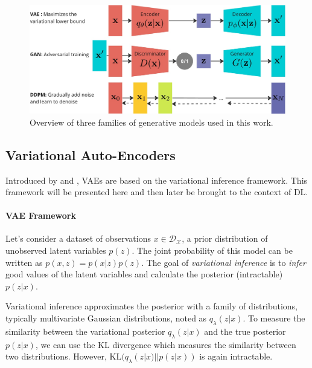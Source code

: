 \begin{figure}[tb]
      \begin{center}
          \includegraphics[width=1.0\linewidth]{images/related/generative_models_overview.jpg}
      \end{center}
      \caption{Overview of three families of generative models used in this work.}
      \label{fig:gen_models}
  \end{figure}


\subsection{Variational Auto-Encoders}\label{section:chapter1_variational_auto_encoders}

Introduced by  \cite{Kingma2014} and \cite{pmlr-v32-rezende14}, \ac{VAE}s are based on the variational 
inference framework. This framework will be presented here and then later be brought to the context of \ac{DL}.

\paragraph{VAE Framework}
Let's consider a dataset of observations $x \in \mathcal{D_X}$, a prior distribution of unobserved latent 
variables $p(z)$. The joint probability of this model can be written as $p(x,z) = p(x|z)p(z)$. The goal of 
\emph{variational inference} is to \emph{infer} good values of the latent variables and calculate the posterior
(intractable) $p(z|x)$. 



Variational inference approximates the posterior with a family of distributions, typically multivariate 
Gaussian distributions, noted as $q_\lambda(z|x)$. To measure the similarity between the variational 
posterior $q_\lambda(z|x)$ and the true posterior $p(z|x)$, we can use the \ac{KL} divergence which measures
the similarity between two distributions. However, $\mathrm{KL}(q_\lambda(z|x) || p(z|x))$ is again intractable.

